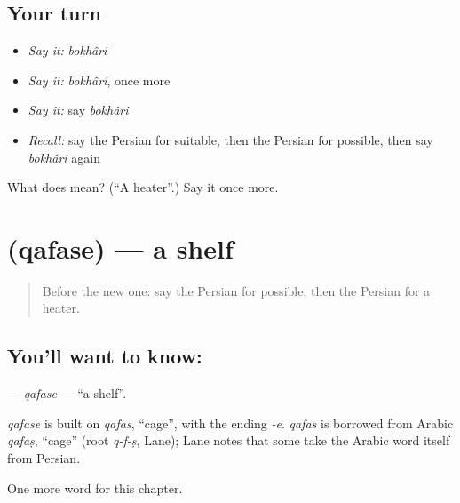 \subsection*{Your turn}
\begin{itemize}
\raggedright
  \item \emph{Say it:} \emph{bokhâri}
  \item \emph{Say it:} \emph{bokhâri}, once more
  \item \emph{Say it:} say \emph{bokhâri}
  \item \emph{Recall:} say the Persian for suitable, then the Persian for possible, then say \emph{bokhâri} again
\end{itemize}

\begin{tcolorbox}[breakable,colback=teal!4,colframe=teal!35!black,title={Before you move on}]
What does  mean? (\textquotedblleft{}A heater\textquotedblright{}.) Say it once more.
\end{tcolorbox}
\section[\texorpdfstring{\fa{قفسه} (qafase)}{قفسه (qafase)}]{ (qafase) — a shelf}

\label{lesson:FA-C274-qafase}



\begin{quote}
Before the new one: say the Persian for possible, then the Persian for a heater.
\end{quote}

\subsection*{You'll want to know: }
\textbf{} — \emph{qafase} — \textquotedblleft{}a shelf\textquotedblright{}.

\begin{cousinweb}
\emph{qafase} is built on \emph{qafas}, \textquotedblleft{}cage\textquotedblright{}, with the ending \emph{-e}. \emph{qafas} is borrowed from Arabic \emph{qafaṣ}, \textquotedblleft{}cage\textquotedblright{} (root \emph{q-f-ṣ}, Lane); Lane notes that some take the Arabic word itself from Persian.
\end{cousinweb}

\begin{grammarlens}[title={What you've built}]
One more word for this chapter.
\end{grammarlens}

